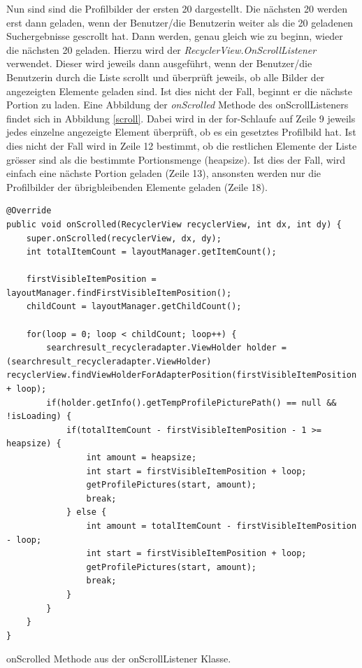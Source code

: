 \documentclass[a4paper,11pt]{report}
\newenvironment{code}{\captionsetup{type=figure}}{}
\begin{document}
		Nun sind sind die Profilbilder der ersten 20 dargestellt. Die nächsten 20 werden erst dann geladen, wenn der Benutzer/die Benutzerin weiter als die 20 geladenen Suchergebnisse gescrollt hat. Dann werden, genau gleich wie zu beginn, wieder die nächsten 20 geladen. Hierzu wird der \emph{RecyclerView.OnScrollListener} verwendet. Dieser wird jeweils dann ausgeführt, wenn der Benutzer/die Benutzerin durch die Liste scrollt und überprüft jeweils, ob alle Bilder der angezeigten Elemente geladen sind. Ist dies nicht der Fall, beginnt er die nächste Portion zu laden. Eine Abbildung der \emph{onScrolled} Methode des onScrollListeners findet sich in Abbildung \ref{scroll}. Dabei wird in der for-Schlaufe auf Zeile 9 jeweils jedes einzelne angezeigte Element überprüft, ob es ein gesetztes Profilbild hat. Ist dies nicht der Fall wird in Zeile 12 bestimmt, ob die restlichen Elemente der Liste grösser sind als die bestimmte Portionsmenge (heapsize). Ist dies der Fall, wird einfach eine nächste Portion geladen (Zeile 13), ansonsten werden nur die Profilbilder der übrigbleibenden Elemente geladen (Zeile 18).

\begin{code}
	\begin{center}
		\begin{verbatim}
@Override
public void onScrolled(RecyclerView recyclerView, int dx, int dy) {
	super.onScrolled(recyclerView, dx, dy);
	int totalItemCount = layoutManager.getItemCount();

	firstVisibleItemPosition = layoutManager.findFirstVisibleItemPosition();
	childCount = layoutManager.getChildCount();

	for(loop = 0; loop < childCount; loop++) {
		searchresult_recycleradapter.ViewHolder holder = (searchresult_recycleradapter.ViewHolder) recyclerView.findViewHolderForAdapterPosition(firstVisibleItemPosition + loop);
		if(holder.getInfo().getTempProfilePicturePath() == null && !isLoading) {
			if(totalItemCount - firstVisibleItemPosition - 1 >= heapsize) {
				int amount = heapsize;
				int start = firstVisibleItemPosition + loop;
				getProfilePictures(start, amount);
				break;
			} else {
				int amount = totalItemCount - firstVisibleItemPosition - loop;
				int start = firstVisibleItemPosition + loop;
				getProfilePictures(start, amount);
				break;
			}
		}
	}
}
		\end{verbatim}
	\end{center}
	\caption{onScrolled Methode aus der onScrollListener Klasse.}
	\label{refresh}
\end{code}
\end{document}
